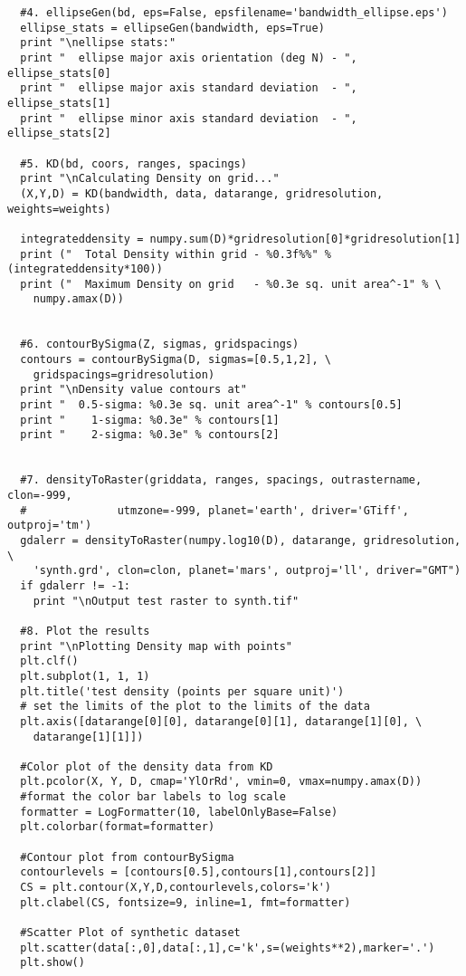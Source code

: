 \begin{verbatim}
  #4. ellipseGen(bd, eps=False, epsfilename='bandwidth_ellipse.eps')
  ellipse_stats = ellipseGen(bandwidth, eps=True)
  print "\nellipse stats:"
  print "  ellipse major axis orientation (deg N) - ", ellipse_stats[0]
  print "  ellipse major axis standard deviation  - ", ellipse_stats[1]
  print "  ellipse minor axis standard deviation  - ", ellipse_stats[2]
  
  #5. KD(bd, coors, ranges, spacings)
  print "\nCalculating Density on grid..."
  (X,Y,D) = KD(bandwidth, data, datarange, gridresolution, weights=weights)
  
  integrateddensity = numpy.sum(D)*gridresolution[0]*gridresolution[1]
  print ("  Total Density within grid - %0.3f%%" % (integrateddensity*100))
  print ("  Maximum Density on grid   - %0.3e sq. unit area^-1" % \
    numpy.amax(D))
    
  
  #6. contourBySigma(Z, sigmas, gridspacings)
  contours = contourBySigma(D, sigmas=[0.5,1,2], \ 
    gridspacings=gridresolution)
  print "\nDensity value contours at"
  print "  0.5-sigma: %0.3e sq. unit area^-1" % contours[0.5]
  print "    1-sigma: %0.3e" % contours[1]
  print "    2-sigma: %0.3e" % contours[2]
  
  
  #7. densityToRaster(griddata, ranges, spacings, outrastername, clon=-999, 
  #              utmzone=-999, planet='earth', driver='GTiff', outproj='tm')
  gdalerr = densityToRaster(numpy.log10(D), datarange, gridresolution, \
    'synth.grd', clon=clon, planet='mars', outproj='ll', driver="GMT")
  if gdalerr != -1:
    print "\nOutput test raster to synth.tif"
  
  #8. Plot the results
  print "\nPlotting Density map with points"
  plt.clf()
  plt.subplot(1, 1, 1)
  plt.title('test density (points per square unit)')
  # set the limits of the plot to the limits of the data
  plt.axis([datarange[0][0], datarange[0][1], datarange[1][0], \
    datarange[1][1]])
  
  #Color plot of the density data from KD
  plt.pcolor(X, Y, D, cmap='YlOrRd', vmin=0, vmax=numpy.amax(D))
  #format the color bar labels to log scale
  formatter = LogFormatter(10, labelOnlyBase=False) 
  plt.colorbar(format=formatter)
  
  #Contour plot from contourBySigma
  contourlevels = [contours[0.5],contours[1],contours[2]]
  CS = plt.contour(X,Y,D,contourlevels,colors='k')
  plt.clabel(CS, fontsize=9, inline=1, fmt=formatter)
  
  #Scatter Plot of synthetic dataset
  plt.scatter(data[:,0],data[:,1],c='k',s=(weights**2),marker='.')
  plt.show()
\end{verbatim}

